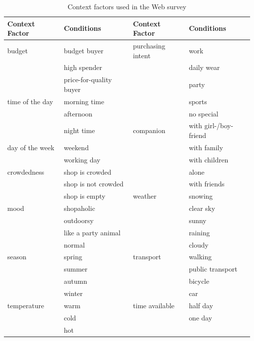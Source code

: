 \begin{table}[H]
	\centering
	\caption{Context factors used in the Web survey}
	\label{tab:factors}
	\small
	\begin{tabular}{p{1in}p{1.4in}|p{1in}p{1.4in}} \hline
		Context Factor & Conditions  & Context Factor & Conditions  \\ \hline 
		budget & budget buyer & purchasing intent & work \\
 		& high spender &  & daily wear \\
 		& price-for-quality buyer &  & party \\
		time of the day & morning time &  & sports \\
 		& afternoon &  & no special \\
 		& night time & companion & with girl-/boy-friend \\
		day of the week & weekend &  & with family  \\
		& working day &  & with children \\
		crowdedness & shop is crowded &  & alone \\
		& shop is not crowded &  & with friends \\
		& shop is empty & weather  & snowing \\
		mood & shopaholic &  & clear sky \\
		& outdoorsy &  & sunny \\
		& like a party animal &  & raining \\
		& normal &  & cloudy \\	
		season & spring & transport & walking \\
 		& summer &  & public transport \\
 		& autumn &  & bicycle \\
 		& winter &  & car \\
		temperature & warm & time available & half day \\
 		& cold &  & one day \\
 		& hot \\ \hline
	\end{tabular}
\end{table}


